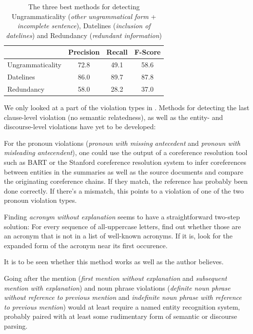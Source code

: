 \documentclass[a4paper,10pt]{scrartcl}
\theoremstyle{style}
\begin{document}
\begin{table}[H]
\begin{center}
\begin{tabular}{|l|c|c|c|}
  \hline
   & Precision & Recall & F-Score\\
  \hline
  Ungrammaticality & 72.8 & 49.1 & 58.6\\
  \hline
  Datelines & 86.0 & 89.7 & 87.8\\
  \hline
  Redundancy & 58.0 & 28.2 & 37.0\\
  \hline
  \end{tabular}
\end{center}
\label{eval_best}
\caption{The three best methods for detecting Ungrammaticality (\textit{other ungrammatical form} + \textit{incomplete sentence}), Datelines (\textit{inclusion of datelines}) and Redundancy (\textit{redundant information})}
\end{table}

We only looked at a part of the violation types in \cite{friedrichlqvsumm}. Methods for detecting the last clause-level violation (no semantic relatedness), as well as the entity- and discourse-level violations have yet to be developed:

For the pronoun violations (\textit{pronoun with missing antecedent} and \textit{pronoun with misleading antecendent}), one could use the output of a coreference resolution tool such as BART \citep{versley2008bart} or the Stanford coreference resolution system \citep{lee2011stanford} to infer coreferences between entities in the summaries as well as the source documents and compare the originating coreference chains. If they match, the reference has probably been done correctly. If there's a mismatch, this points to a violation of one of the two pronoun violation types.

Finding \textit{acronym without explanation} seems to have a straightforward two-step solution: For every sequence of all-uppercase letters, find out whether those are an acronym that is not in a list of well-known acronyms. If it is, look for the expanded form of the acronym near its first occurence.

It is to be seen whether this method works as well as the author believes.


Going after the mention (\textit{first mention without explanation} and \textit{subsequent mention with explanation}) and noun phrase violations (\textit{definite noun phrase without reference to previous mention} and \textit{indefinite noun phrase with reference to previous mention}) would at least require a named entity recognition system, probably paired with at least some rudimentary form of semantic or discourse parsing.
\end{document}
